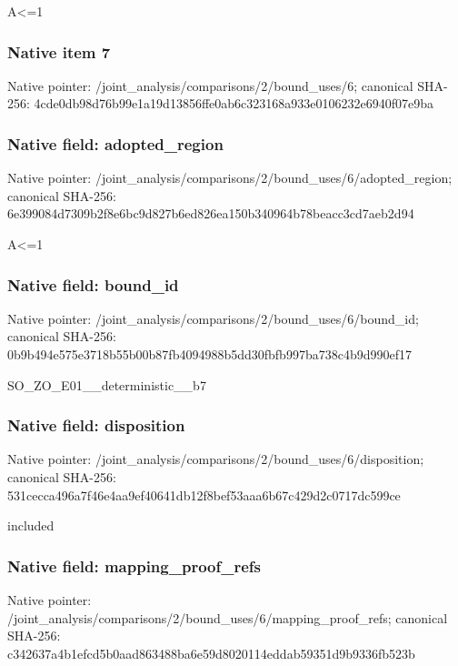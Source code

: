 \documentclass[10pt,a4paper]{article}
\begin{document}
\begingroup\raggedright\sloppy A<=\allowbreak{}1\par\endgroup

\subsubsection{Native item 7}
Native pointer: /joint\_\allowbreak{}analysis/comparisons/2/bound\_\allowbreak{}uses/6; canonical SHA-256: 4cde0db98d76b99e1a19d13856ffe0ab6c323168a933e0106232e6940f07e9ba

\subsubsection{Native field: adopted\_\allowbreak{}region}
Native pointer: /joint\_\allowbreak{}analysis/comparisons/2/bound\_\allowbreak{}uses/6/adopted\_\allowbreak{}region; canonical SHA-256: 6e399084d7309b2f8e6bc9d827b6ed826ea150b340964b78beacc3cd7aeb2d94

\begingroup\raggedright\sloppy A<=\allowbreak{}1\par\endgroup

\subsubsection{Native field: bound\_\allowbreak{}id}
Native pointer: /joint\_\allowbreak{}analysis/comparisons/2/bound\_\allowbreak{}uses/6/bound\_\allowbreak{}id; canonical SHA-256: 0b9b494e575e3718b55b00b87fb4094988b5dd30fbfb997ba738c4b9d990ef17

\begingroup\raggedright\sloppy SO\_\allowbreak{}ZO\_\allowbreak{}E01\_\allowbreak{}\_\allowbreak{}deterministic\_\allowbreak{}\_\allowbreak{}b7\par\endgroup

\subsubsection{Native field: disposition}
Native pointer: /joint\_\allowbreak{}analysis/comparisons/2/bound\_\allowbreak{}uses/6/disposition; canonical SHA-256: 531cecca496a7f46e4aa9ef40641db12f8bef53aaa6b67c429d2c0717dc599ce

\begingroup\raggedright\sloppy included\par\endgroup

\subsubsection{Native field: mapping\_\allowbreak{}proof\_\allowbreak{}refs}
Native pointer: /joint\_\allowbreak{}analysis/comparisons/2/bound\_\allowbreak{}uses/6/mapping\_\allowbreak{}proof\_\allowbreak{}refs; canonical SHA-256: c342637a4b1efcd5b0aad863488ba6e59d8020114eddab59351d9b9336fb523b
\end{document}
